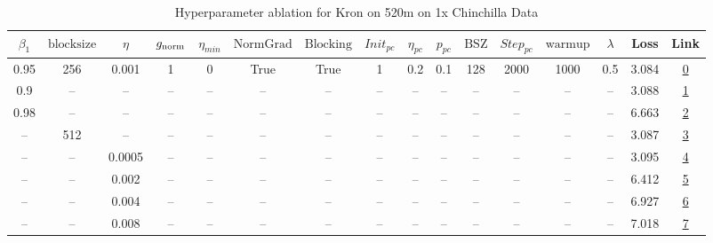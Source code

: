 \begin{table}[H]
\centering
\caption{Hyperparameter ablation for Kron on 520m on 1x Chinchilla Data}
\label{tab:ablation_kron_520m_on_1x_chinchilla_data}
\begin{tabular}{cccccccccccccccc}
\toprule
$\beta_1$ & $\mathrm{block size}$ & $\eta$ & $g_{\mathrm{norm}}$ & $\eta_{min}$ & $\mathrm{NormGrad}$ & $\mathrm{Blocking}$ & $Init_{pc}$ & $\eta_{pc}$ & $p_{pc}$ & $\mathrm{BSZ}$ & $Step_{pc}$ & $\mathrm{warmup}$ & $\lambda$ & Loss & Link \\
\midrule
0.95 & 256 & 0.001 & 1 & 0 & True & True & 1 & 0.2 & 0.1 & 128 & 2000 & 1000 & 0.5 & 3.084 & \href{https://wandb.ai/marin-community/optimizer-scaling/runs/sweep-520m-10B-kronb99966lr0.001-wd0.5-b10.95-plr0.2-pis1-gn1-no-99dc7c}{0} \\
\midrule
0.9 & -- & -- & -- & -- & -- & -- & -- & -- & -- & -- & -- & -- & -- & 3.088 & \href{https://wandb.ai/marin-community/optimizer-scaling/runs/sweep-520m-10B-kron8de5balr0.001-wd0.5-b10.9-plr0.2-pis1-gn1-nor-bd8414}{1} \\
0.98 & -- & -- & -- & -- & -- & -- & -- & -- & -- & -- & -- & -- & -- & 6.663 & \href{https://wandb.ai/marin-community/optimizer-scaling/runs/sweep-520m-10B-kron40f5fdlr0.001-wd0.5-b10.98-plr0.2-pis1-gn1-no-d16344}{2} \\
-- & 512 & -- & -- & -- & -- & -- & -- & -- & -- & -- & -- & -- & -- & 3.087 & \href{https://wandb.ai/marin-community/optimizer-scaling/runs/sweep-520m-10B-kronb561bdlr0.001-wd0.5-b10.95-plr0.2-pis1-gn1-no-1c08ad}{3} \\
-- & -- & 0.0005 & -- & -- & -- & -- & -- & -- & -- & -- & -- & -- & -- & 3.095 & \href{https://wandb.ai/marin-community/optimizer-scaling/runs/sweep-520m-10B-krondf7ba9lr0.0005-wd0.5-b10.95-plr0.2-pis1-gn1-n-d65d46}{4} \\
-- & -- & 0.002 & -- & -- & -- & -- & -- & -- & -- & -- & -- & -- & -- & 6.412 & \href{https://wandb.ai/marin-community/optimizer-scaling/runs/sweep-520m-10B-kron5b495flr0.002-wd0.5-b10.95-plr0.2-pis1-gn1-no-c64c4f}{5} \\
-- & -- & 0.004 & -- & -- & -- & -- & -- & -- & -- & -- & -- & -- & -- & 6.927 & \href{https://wandb.ai/marin-community/optimizer-scaling/runs/sweep-520m-10B-kron6d4a78lr0.004-wd0.5-b10.95-plr0.2-pis1-gn1-no-018cac}{6} \\
-- & -- & 0.008 & -- & -- & -- & -- & -- & -- & -- & -- & -- & -- & -- & 7.018 & \href{https://wandb.ai/marin-community/optimizer-scaling/runs/sweep-520m-10B-kron93bd52lr0.008-wd0.5-b10.95-plr0.2-pis1-gn1-no-a3a0f8}{7} \\

\end{tabular}
\end{table}
